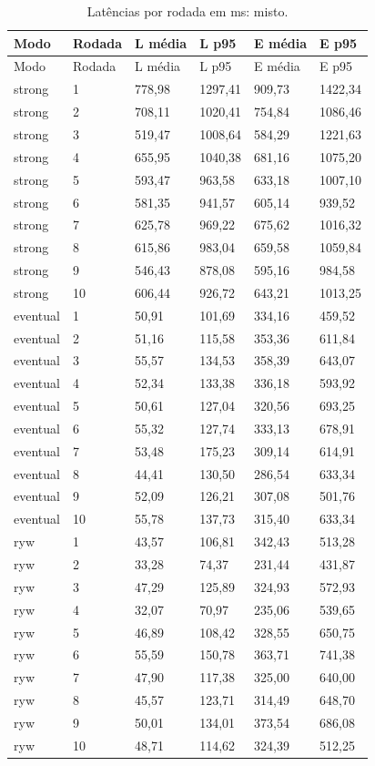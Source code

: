 \begingroup\small\setlength{\tabcolsep}{4pt}
\begin{longtable}{llllll}
\caption{Latências por rodada em ms: misto.}\\
\toprule
Modo & Rodada & L média & L p95 & E média & E p95\\\midrule\endfirsthead
\toprule
Modo & Rodada & L média & L p95 & E média & E p95\\\midrule\endhead
\bottomrule\endfoot
strong & 1 & 778,98 & 1297,41 & 909,73 & 1422,34\\
strong & 2 & 708,11 & 1020,41 & 754,84 & 1086,46\\
strong & 3 & 519,47 & 1008,64 & 584,29 & 1221,63\\
strong & 4 & 655,95 & 1040,38 & 681,16 & 1075,20\\
strong & 5 & 593,47 & 963,58 & 633,18 & 1007,10\\
strong & 6 & 581,35 & 941,57 & 605,14 & 939,52\\
strong & 7 & 625,78 & 969,22 & 675,62 & 1016,32\\
strong & 8 & 615,86 & 983,04 & 659,58 & 1059,84\\
strong & 9 & 546,43 & 878,08 & 595,16 & 984,58\\
strong & 10 & 606,44 & 926,72 & 643,21 & 1013,25\\
eventual & 1 & 50,91 & 101,69 & 334,16 & 459,52\\
eventual & 2 & 51,16 & 115,58 & 353,36 & 611,84\\
eventual & 3 & 55,57 & 134,53 & 358,39 & 643,07\\
eventual & 4 & 52,34 & 133,38 & 336,18 & 593,92\\
eventual & 5 & 50,61 & 127,04 & 320,56 & 693,25\\
eventual & 6 & 55,32 & 127,74 & 333,13 & 678,91\\
eventual & 7 & 53,48 & 175,23 & 309,14 & 614,91\\
eventual & 8 & 44,41 & 130,50 & 286,54 & 633,34\\
eventual & 9 & 52,09 & 126,21 & 307,08 & 501,76\\
eventual & 10 & 55,78 & 137,73 & 315,40 & 633,34\\
ryw & 1 & 43,57 & 106,81 & 342,43 & 513,28\\
ryw & 2 & 33,28 & 74,37 & 231,44 & 431,87\\
ryw & 3 & 47,29 & 125,89 & 324,93 & 572,93\\
ryw & 4 & 32,07 & 70,97 & 235,06 & 539,65\\
ryw & 5 & 46,89 & 108,42 & 328,55 & 650,75\\
ryw & 6 & 55,59 & 150,78 & 363,71 & 741,38\\
ryw & 7 & 47,90 & 117,38 & 325,00 & 640,00\\
ryw & 8 & 45,57 & 123,71 & 314,49 & 648,70\\
ryw & 9 & 50,01 & 134,01 & 373,54 & 686,08\\
ryw & 10 & 48,71 & 114,62 & 324,39 & 512,25\\
\end{longtable}
\endgroup

